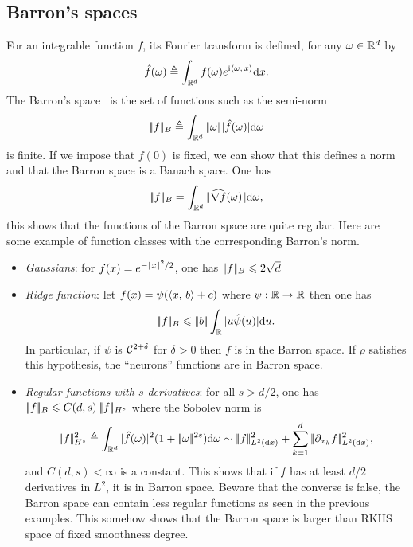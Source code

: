 \subsection{Barron's spaces}

For an integrable function $f$, its Fourier transform is defined, for any $\omega \in \mathbb{R}^d $ by
$$
    \hat{f}(\omega) \triangleq \int_{\mathbb{R}^d}f(\omega) e^{\mathrm{i} \langle \omega,\,x\rangle } \mathrm{d} x.
$$
The Barron's space~\cite{barron1993universal} is the set of functions such as the semi-norm
$$
	|\!| f |\!|_B \triangleq  \int_{\mathbb{R}^d}|\!| \omega |\!| | \hat{f}(\omega) | \mathrm{d}\omega 
$$ 
is finite. If we impose that $f(0)$ is fixed, we can show that this defines a norm and that the Barron space is a Banach space.
One has
$$
	|\!| f |\!|_B = \int_{\mathbb{R}^d} |\!| \widehat{\nabla f}(\omega) |\!| \mathrm{d}\omega, 
$$ 
this shows that the functions of the Barron space are quite regular.
%
Here are some example of function classes with the corresponding Barron's norm.
\begin{itemize}
    \item \emph{Gaussians}: for $f(x) = e^{- |\!| x |\!|^2/2}$, one has $|\!| f |\!|_B \leqslant 2 \sqrt{d}$
    \item \emph{Ridge function}: let $ f(x) = \psi (\langle x,\,b\rangle + c) $ where $\psi: \mathbb{R} \rightarrow \mathbb{R}$ then one has
    $$
    	|\!| f |\!|_B \leqslant |\!| b |\!| \int_{\mathbb{R}} |u \hat{\psi}(u) | \mathrm{d} u. 
	$$ 
    In particular,  if $\psi$ is $\mathcal{C}^{2 + \delta}$ for $\delta> 0 $ then $f$ is in the Barron space. If $\rho$ satisfies this hypothesis, the ``neurons'' functions are in Barron space.
    \item \emph{Regular functions with $ s $ derivatives}: for all $ s>d/2 $, one has $|\!| f |\!|_B \leqslant C(d,s) \: |\!| f |\!|_{H^s}$ where 
    the Sobolev norm is
    $$
    	\norm{f}^2_{H^s} \triangleq \int_{\RR^d}| \hat{f}(\omega) |^2 (1+ \norm{\omega}^{2s}) \d\omega 
		\sim \norm{f}_{L^2(\d x)}^2 + \sum_{k=1}^d \norm{\partial_{x_k} f}_{L^2(\d x)}^2, 
	$$ 
	and $ C(d,s) <\infty$ is a constant. This shows that if $ f $ has at least $ d / 2 $ derivatives in $L^2$, it is in Barron space. Beware that the converse is false, the Barron space can contain less regular functions as seen in the previous examples.
	This somehow shows that the Barron space is larger than RKHS space of fixed smoothness degree.
\end{itemize}



